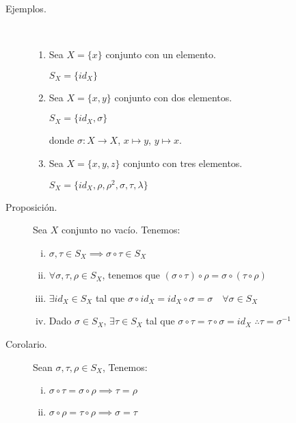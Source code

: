 \documentclass[12pt]{article}
\begin{document}
\begin{description}
	\item [Ejemplos.] \mbox{}\\

\begin{enumerate}
\item Sea $X = \{ x \}$ conjunto con un elemento.

\begin{math}
	S_X = \{ id_X \}
\end{math}

\item Sea $X = \{ x,y \}$ conjunto con dos elementos.

\begin{math}
	S_X = \{ id_X, \sigma \}
\end{math}

donde $\sigma : X \to X$, $x \mapsto y$, $y \mapsto x$.

\item Sea $X = \{ x,y,z \}$ conjunto con tres elementos.

\begin{math}
	S_X = \{ id_X, \rho, \rho^2, \sigma, \tau, \lambda \}
\end{math}
\end{enumerate}

\item [Proposición.] Sea $X$ conjunto no vacío. Tenemos:

\begin{enumerate}[i)]
	\item $\sigma, \tau \in S_X \implies \sigma \circ \tau \in S_X$
	\item $\forall \sigma, \tau, \rho \in S_X$, tenemos que $(\sigma \circ \tau) \circ \rho = \sigma \circ (\tau \circ \rho)$
	\item $\exists id_X \in S_X$ tal que $\sigma \circ id_X = id_X \circ \sigma = \sigma \quad \forall \sigma \in S_X$
	\item Dado $\sigma \in S_X$, $\exists \tau \in S_X$ tal que $\sigma \circ \tau = \tau \circ \sigma = id_X$ $\therefore \tau = \sigma^{-1}$
\end{enumerate}

\item [Corolario.] Sean $\sigma, \tau, \rho \in S_X$, Tenemos:

\begin{enumerate}[i)]
	\item $\sigma \circ \tau = \sigma \circ \rho \implies \tau = \rho$
	\item $\sigma \circ \rho = \tau \circ \rho \implies \sigma = \tau$
\end{enumerate}


\end{description}
\end{document}
